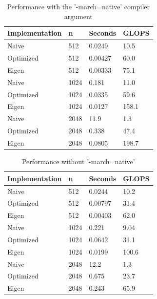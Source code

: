 \documentclass{article}
\begin{document}
\section{}

\begin{table}[]
\begin{centering}
\begin{tabular}{|l|l|l|l|}
\hline
Implementation & n    & Seconds   & GLOPS   \\ \hline
Naive          & 512  & 0.0249    & 10.5    \\ \hline
Optimized      & 512  & 0.00427   & 60.0    \\ \hline
Eigen          & 512  & 0.00333   & 75.1    \\ \hline
Naive          & 1024 & 0.181     & 11.0    \\ \hline
Optimized      & 1024 & 0.0335    & 59.6    \\ \hline
Eigen          & 1024 & 0.0127    & 158.1   \\ \hline
Naive          & 2048 & 11.9      & 1.3     \\ \hline
Optimized      & 2048 & 0.338     & 47.4    \\ \hline
Eigen          & 2048 & 0.0805    & 198.7   \\ \hline
\end{tabular}
\caption{Performance with the '-march=native' compiler argument}
\end{centering}
\end{table}


\begin{table}[]
\begin{centering}
\begin{tabular}{|l|l|l|l|}
\hline
Implementation & n    & Seconds   & GLOPS   \\ \hline
Naive          & 512  & 0.0244    & 10.2    \\ \hline
Optimized      & 512  & 0.00797   & 31.4    \\ \hline
Eigen          & 512  & 0.00403   & 62.0    \\ \hline
Naive          & 1024 & 0.221     & 9.04    \\ \hline
Optimized      & 1024 & 0.0642    & 31.1    \\ \hline
Eigen          & 1024 & 0.0199    & 100.6   \\ \hline
Naive          & 2048 & 12.2      & 1.3     \\ \hline
Optimized      & 2048 & 0.675     & 23.7    \\ \hline
Eigen          & 2048 & 0.243     & 65.9    \\ \hline
\end{tabular}
\caption{Performance without '-march=native'}
\end{centering}
\end{table}
\end{document}
